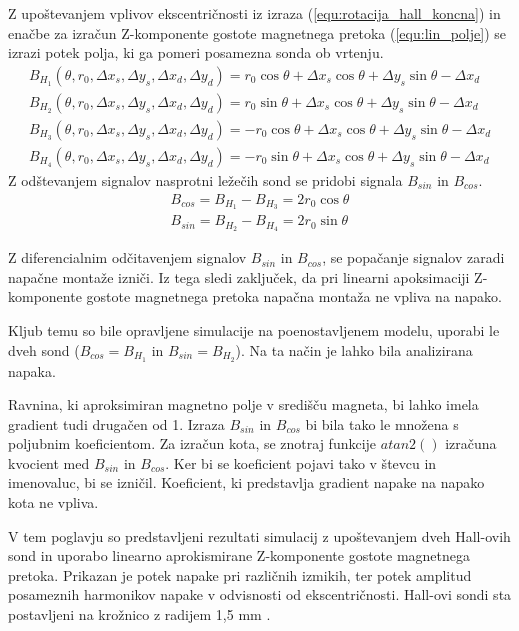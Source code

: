 Z upoštevanjem vplivov ekscentričnosti iz izraza (\ref{equ:rotacija_hall_koncna}) in enačbe za izračun Z-komponente gostote magnetnega pretoka (\ref{equ:lin_polje}) se izrazi potek polja, ki ga pomeri posamezna sonda ob vrtenju.
\begin{eqnarray}
\label{equ:lin_potek_sin}
B_{H_1}(\theta, r_0, \Delta x_s, \Delta y_s, \Delta x_d, \Delta y_d)=  r_0 \cos \theta + \Delta x_s \cos \theta+ \Delta y_s \sin \theta -\Delta x_d\\
\label{equ:lin_potek_cos}
B_{H_2}(\theta, r_0, \Delta x_s, \Delta y_s, \Delta x_d, \Delta y_d)= r_0 \sin \theta + \Delta x_s \cos \theta+ \Delta y_s \sin \theta -\Delta x_d\\
B_{H_3}(\theta, r_0, \Delta x_s, \Delta y_s, \Delta x_d, \Delta y_d)=  -r_0 \cos \theta + \Delta x_s \cos \theta+ \Delta y_s \sin \theta -\Delta x_d\\
\label{equ:lin_potek_zadnja}
B_{H_4}(\theta, r_0, \Delta x_s, \Delta y_s, \Delta x_d, \Delta y_d)=-r_0 \sin \theta + \Delta x_s \cos \theta+ \Delta y_s \sin \theta -\Delta x_d
\end{eqnarray}
Z odštevanjem signalov nasprotni ležečih sond se pridobi signala  $B_{sin}$ in $B_{cos}$.
\begin{eqnarray}
B_{cos}=  B_{H_1} - B_{H_3} = 2 r_0 \cos \theta \\
B_{sin}=  B_{H_2} - B_{H_4}=  2 r_0 \sin \theta
\end{eqnarray}

Z diferencialnim odčitavenjem signalov  $B_{sin}$ in $B_{cos}$, se popačanje signalov zaradi napačne montaže izniči. Iz tega sledi zaključek, da pri linearni apoksimaciji Z-komponente gostote magnetnega pretoka napačna montaža ne vpliva na napako.

Kljub temu so bile opravljene simulacije na poenostavljenem modelu, uporabi le dveh sond
 ($B_{cos}=B_{H_1}$ in $B_{sin}=B_{H_2}$). Na ta način je lahko bila analizirana napaka.
 
 Ravnina, ki aproksimiran magnetno polje v središču magneta, bi lahko imela gradient tudi drugačen od 1.
 Izraza $B_{sin}$ in $B_{cos}$ bi bila tako le množena s poljubnim koeficientom. Za izračun kota, se znotraj funkcije $atan2()$ izračuna kvocient med $B_{sin}$ in $B_{cos}$. Ker bi se koeficient  pojavi tako v števcu in imenovaluc, bi se izničil. Koeficient, ki predstavlja gradient napake na napako kota ne vpliva.

V tem poglavju so predstavljeni rezultati simulacij z upoštevanjem dveh Hall-ovih sond in uporabo linearno aprokismirane Z-komponente gostote magnetnega pretoka.
Prikazan je potek napake pri različnih izmikih, ter potek amplitud posameznih harmonikov napake v odvisnosti od ekscentričnosti.
Hall-ovi sondi sta postavljeni na krožnico z radijem 1,5 mm \cite{AM8192}.
